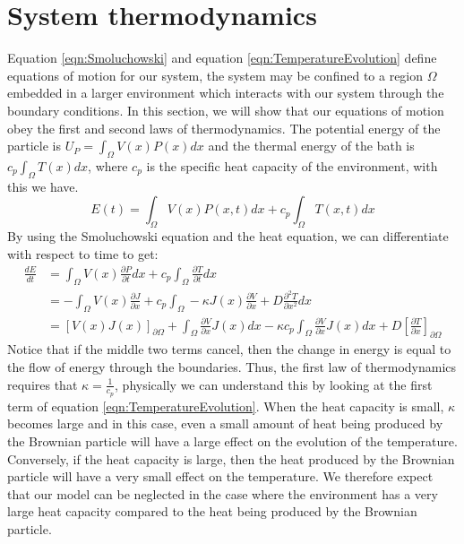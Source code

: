 \section{System thermodynamics}
Equation \ref{eqn:Smoluchowski} and equation \ref{eqn:TemperatureEvolution} define equations of motion for our system, the system may be confined to a region $\Omega$ embedded in a larger environment which interacts with our system through the boundary conditions. In this section, we will show that our equations of motion obey the first and second laws of thermodynamics. The potential energy of the particle is $U_P = \int_{\Omega} V(x) P(x) dx$ and the thermal energy of the bath is $c_p \int_{\Omega} T(x) dx$, where $c_p$ is the specific heat capacity of the environment, with this we have.
\begin{equation}
E(t) = \int_{\Omega} V(x)P(x, t) dx + c_p \int_{\Omega} T(x, t) dx
\end{equation}
By using the Smoluchowski equation and the heat equation, we can differentiate with respect to time to get:
\begin{align}
\frac{d E}{d t} & = \int_{\Omega} V(x) \frac{\partial P}{\partial t} dx + c_p \int_{\Omega} \frac{\partial T}{\partial t} dx \\
 & = -\int_{\Omega} V(x) \frac{\partial J}{\partial x} + c_p \int_{\Omega} -\kappa J(x) \frac{\partial V}{\partial x} + D \frac{\partial^2 T}{\partial x^2} dx \\
 & = [V(x)J(x)]_{\partial \Omega}+ \int_{\Omega} \frac{\partial V}{\partial x} J(x) dx - \kappa c_p \int_{\Omega} \frac{\partial V}{\partial x} J(x) dx + D \left [\frac{\partial T}{\partial x} \right]_{\partial \Omega}
\end{align}
Notice that if the middle two terms cancel, then the change in energy is equal to the flow of energy through the boundaries. Thus, the first law of thermodynamics requires that $\kappa = \frac{1}{c_p}$, physically we can understand this by looking at the first term of equation \ref{eqn:TemperatureEvolution}. When the heat capacity is small, $\kappa$ becomes large and in this case, even a small amount of heat being produced by the Brownian particle will have a large effect on the evolution of the temperature. Conversely, if the heat capacity is large, then the heat produced by the Brownian particle will have a very small effect on the temperature. We therefore expect that our model can be neglected in the case where the environment has a very large heat capacity compared to the heat being produced by the Brownian particle.

